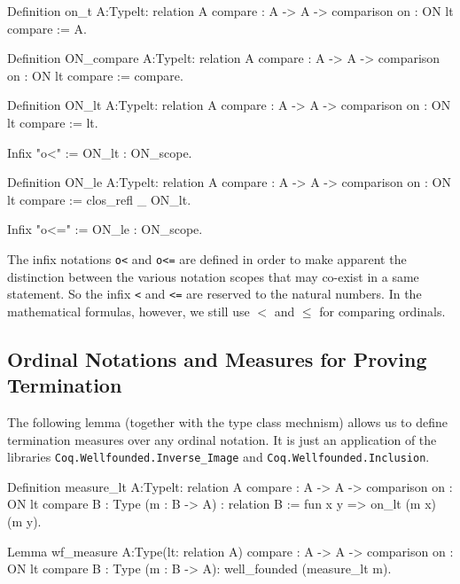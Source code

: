 \label{sect:on-lt-notation}
\label{sect:on-le-notation}
\begin{Coqsrc}
Definition on_t  {A:Type}{lt: relation A}
            {compare : A -> A -> comparison}
            {on : ON lt compare} := A.

Definition ON_compare {A:Type}{lt: relation A}
            {compare : A -> A -> comparison}
            {on : ON lt compare} := compare.

Definition ON_lt {A:Type}{lt: relation A}
           {compare : A -> A -> comparison}
           {on : ON lt compare} := lt.

Infix "o<" := ON_lt : ON_scope.

Definition ON_le  {A:Type}{lt: relation A}
           {compare : A -> A -> comparison}
           {on : ON lt compare} :=
  clos_refl _ ON_lt.

Infix "o<=" := ON_le : ON_scope.
\end{Coqsrc}


\begin{remark}
The infix notations \texttt{o<} and \texttt{o<=} are defined in order to make apparent the distinction between the various notation scopes that may co-exist in a same statement. So the infix \texttt{<} and \texttt{<=} are reserved to the natural numbers. In the mathematical formulas, however, we still use $<$ and $\leq$ for comparing ordinals.
\end{remark}


\subsection{Ordinal Notations and Measures for Proving Termination}
\label{sect:measure-ON}

The following lemma (together with the type class mechnism) allows us to define termination measures over any ordinal notation. It is just an application of  the libraries \texttt{Coq.Wellfounded.Inverse\_Image}
and  \texttt{Coq.Wellfounded.Inclusion}. 

\begin{Coqsrc}
Definition measure_lt {A:Type}{lt: relation A}
            {compare : A -> A -> comparison}
            {on : ON lt compare}
            {B : Type} (m : B -> A) : relation B :=
             fun x y => on_lt (m x) (m y).
            
Lemma wf_measure  {A:Type}(lt: relation A)
            {compare : A -> A -> comparison}
            {on : ON lt compare}
            {B : Type}
            (m : B -> A):  well_founded (measure_lt m). 
\end{Coqsrc}

